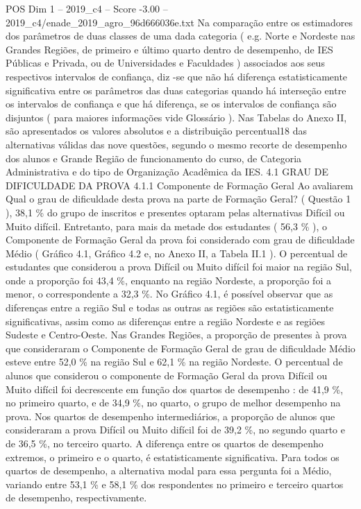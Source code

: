 \begin{textsample}{POS Dim 1 – 2019\_c4 – Score -3.00 – 2019\_c4/enade\_2019\_agro\_96d666036e.txt}
Na comparação entre os estimadores dos parâmetros de duas classes de uma dada categoria ( e.g.
Norte e Nordeste nas Grandes Regiões, de primeiro e último quarto dentro de desempenho, de IES Públicas e Privada, ou de Universidades e Faculdades ) associados aos seus respectivos intervalos de confiança, diz -se que não há diferença estatisticamente significativa entre os parâmetros das duas categorias quando há interseção entre os intervalos de confiança e que há diferença, se os intervalos de confiança são disjuntos ( para maiores informações vide Glossário ).
Nas Tabelas do Anexo II, são apresentados os valores absolutos e a distribuição percentual18 das alternativas válidas das nove questões, segundo o mesmo recorte de desempenho dos alunos e Grande Região de funcionamento do curso, de Categoria Administrativa e do tipo de Organização Acadêmica da IES. 4.1 GRAU DE DIFICULDADE DA PROVA 4.1.1 Componente de Formação Geral Ao avaliarem Qual o grau de dificuldade desta prova na parte de Formação Geral? ( Questão 1 ), 38,1 \% do grupo de inscritos e presentes optaram pelas alternativas Difícil ou Muito difícil.
Entretanto, para mais da metade dos estudantes ( 56,3 \% ), o Componente de Formação Geral da prova foi considerado com grau de dificuldade Médio ( Gráfico 4.1, Gráfico 4.2 e, no Anexo II, a Tabela II.1 ).
O percentual de estudantes que considerou a prova Difícil ou Muito difícil foi maior na região Sul, onde a proporção foi 43,4 \%, enquanto na região Nordeste, a proporção foi a menor, o correspondente a 32,3 \%.
No Gráfico 4.1, é possível observar que as diferenças entre a região Sul e todas as outras as regiões são estatisticamente significativas, assim como as diferenças entre a região Nordeste e as regiões Sudeste e Centro-Oeste.
Nas Grandes Regiões, a proporção de presentes à prova que consideraram o Componente de Formação Geral de grau de dificuldade Médio esteve entre 52,0 \% na região Sul e 62,1 \% na região Nordeste.
O percentual de alunos que considerou o componente de Formação Geral da prova Difícil ou Muito difícil foi decrescente em função dos quartos de desempenho : de 41,9 \%, no primeiro quarto, e de 34,9 \%, no quarto, o grupo de melhor desempenho na prova.
Nos quartos de desempenho intermediários, a proporção de alunos que consideraram a prova Difícil ou Muito difícil foi de 39,2 \%, no segundo quarto e de 36,5 \%, no terceiro quarto.
A diferença entre os quartos de desempenho extremos, o primeiro e o quarto, é estatisticamente significativa.
Para todos os quartos de desempenho, a alternativa modal para essa pergunta foi a Médio, variando entre 53,1 \% e 58,1 \% dos respondentes no primeiro e terceiro quartos de desempenho, respectivamente.

\end{textsample}
